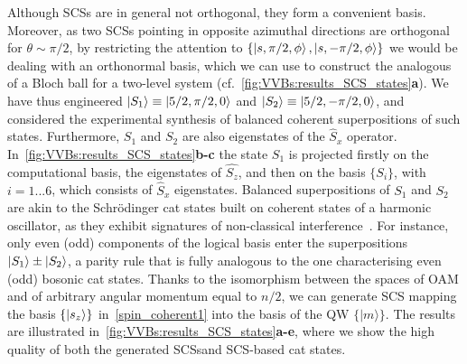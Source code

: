 Although \acp{SCS} are in general not orthogonal, they form a convenient basis. Moreover, as two \acp{SCS} pointing in opposite azimuthal directions are orthogonal for $\theta\sim\pi/2$, by restricting the attention to $\{\ket{s,\pi/2,\phi},\ket{s,-\pi/2,\phi}\}$ we would be dealing with an orthonormal basis, which we can use to construct the analogous of a Bloch ball for a two-level system (cf.~\cref{fig:VVBs:results_SCS_states}\textbf{a}). We have thus engineered $\ket{S_1}\equiv\ket{5/2,\pi/2,0}$ and $\ket{S_2}\equiv\ket{5/2,-\pi/2,0}$, and considered the experimental synthesis of balanced coherent superpositions of such states.
Furthermore, $S_1$ and $S_2$ are also eigenstates of the $\hat{S}_x$ operator. In~\cref{fig:VVBs:results_SCS_states}\textbf{b-c} the state $S_1$ is projected firstly on the computational basis, the eigenstates of $\hat{S_z}$, and then on the basis $\{S_i\}$, with $i=1...6$, which consists of $\hat{S}_x$ eigenstates. Balanced superpositions of $S_1$ and $S_2$ are akin to the Schrödinger cat states built on coherent states of a harmonic oscillator, as they exhibit signatures of non-classical interference~\cite{agarwal1997atomic}. For instance, only even (odd) components of the logical basis enter the superpositions $\ket{S_1}\pm\ket{S_2}$, a parity rule that is fully analogous to the one characterising even (odd) bosonic cat states. Thanks to the isomorphism between the spaces of \ac{OAM} and of arbitrary angular momentum equal to $n/2$, we can generate \ac{SCS} mapping the basis $\{ \ket{s_z}\}$ in~\cref{spin_coherent1} into the basis of the \ac{QW} $\{|m\rangle\}$. The results are illustrated in~\cref{fig:VVBs:results_SCS_states}\textbf{a-e}, where we show the high quality of both the generated \acp{SCS}and \ac{SCS}-based cat states.

